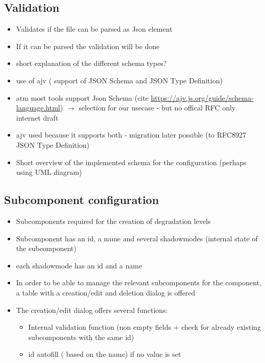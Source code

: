 \subsection{Validation}
\begin{itemize}
    \item Validates if the file can be parsed as Json element
    \item If it can be parsed the validation will be done
    \item short explanation of the different schema types?
    \item use of ajv ( support of JSON Schema and JSON Type Definition)
    \item atm most tools support Json Schema (cite \url{https://ajv.js.org/guide/schema-language.html})  $\rightarrow$ selection for our usecase - but no offical RFC only internet draft
    \item ajv used because it supports both - migration later possible (to RFC8927 JSON Type Definition)
    \item Short overview of the implemented schema for the configuration (perhaps using UML diagram)
\end{itemize}

\subsection{Subcomponent configuration}
\begin{itemize}
    \item Subcomponents required for the creation of degradation levels
    \item Subcomponent has an id, a name and several shadowmodes (internal state of the subcomponent)
    \item each shadowmode has an id and a name 
    \item In order to be able to manage the relevant subcomponents for the component, a table with a creation/edit and deletion dialog is offered
    \item The creation/edit dialog offers several functions: 
        \begin{itemize}
            \item Internal validation function (non empty fields + check for already existing subcomponents with the same id)
            \item id autofill ( based on the name) if no value is set
        \end{itemize}
\end{itemize}

